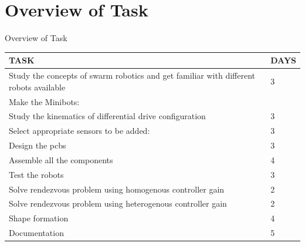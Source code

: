 \documentclass[10pt, a4paper]{beamer}
\begin{document}
\section{Overview of Task}
\begin{frame}{Overview of Task}
	\begin{center}
		\begin{tabular}{|p{8cm}|p{1cm}|} 
			\hline
			\textbf{TASK} & \textbf{DAYS} \\ 
			\hline
			Study the concepts of swarm robotics and get familiar with different robots available & 3 \\ 
			\hline
			Make the Minibots: & \\ 
			\hline
			Study the kinematics of differential drive configuration & 3 \\ 
			\hline
			Select appropriate sensors to be added: & 3 \\ 
			\hline
			Design the pcbs & 3 \\ 
			\hline
			Assemble all the components & 4 \\ 
			\hline
			Test the robots & 3 \\ 
			\hline
			Solve rendezvous problem using homogenous controller gain & 2 \\ 
			\hline
			Solve rendezvous problem using heterogenous controller gain & 2 \\ 
			\hline
			Shape formation & 4 \\ 
			\hline
			Documentation & 5 \\ 
			\hline		
		\end{tabular}
	\end{center}
\end{frame}
\end{document}

